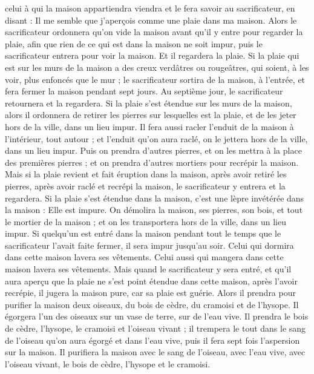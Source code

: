 \begin{multicols}{2}
celui à qui la maison appartiendra viendra et le fera savoir au sacrificateur, en disant : Il me semble que j'aperçois comme une plaie dans ma maison.
Alors le sacrificateur ordonnera qu'on vide la maison avant qu'il y entre pour regarder la plaie, afin que rien de ce qui est dans la maison ne soit impur, puis le sacrificateur entrera pour voir la maison.
Et il regardera la plaie. Si la plaie qui est sur les murs de la maison a des creux verdâtres ou rougeâtres, qui soient, à les voir, plus enfoncés que le mur ;
le sacrificateur sortira de la maison, à l'entrée, et fera fermer la maison pendant sept jours.
Au septième jour, le sacrificateur retournera et la regardera. Si la plaie s'est étendue sur les murs de la maison,
alors il ordonnera de retirer les pierres sur lesquelles est la plaie, et de les jeter hors de la ville, dans un lieu impur.
Il fera aussi racler l'enduit de la maison à l'intérieur, tout autour ; et l'enduit qu'on aura raclé, on le jettera hors de la ville, dans un lieu impur.
Puis on prendra d'autres pierres, et on les mettra à la place des premières pierres ; et on prendra d'autres mortiers pour recrépir la maison.
Mais si la plaie revient et fait éruption dans la maison, après avoir retiré les pierres, après avoir raclé et recrépi la maison,
le sacrificateur y entrera et la regardera. Si la plaie s'est étendue dans la maison, c'est une lèpre invétérée dans la maison : Elle est impure.
On démolira la maison, ses pierres, son bois, et tout le mortier de la maison ; et on les transportera hors de la ville, dans un lieu impur.
Si quelqu'un est entré dans la maison pendant tout le temps que le sacrificateur l'avait faite fermer, il sera impur jusqu'au soir.
Celui qui dormira dans cette maison lavera ses vêtements. Celui aussi qui mangera dans cette maison lavera ses vêtements.
Mais quand le sacrificateur y sera entré, et qu'il aura aperçu que la plaie ne s'est point étendue dans cette maison, après l'avoir recrépie, il jugera la maison pure, car sa plaie est guérie.
Alors il prendra pour purifier la maison deux oiseaux, du bois de cèdre, du cramoisi et de l'hysope.
Il égorgera l'un des oiseaux sur un vase de terre, sur de l'eau vive.
Il prendra le bois de cèdre, l'hysope, le cramoisi et l'oiseau vivant ; il trempera le tout dans le sang de l'oiseau qu'on aura égorgé et dans l'eau vive, puis il fera sept fois l'aspersion sur la maison.
Il purifiera la maison avec le sang de l'oiseau, avec l'eau vive, avec l'oiseau vivant, le bois de cèdre, l'hysope et le cramoisi.

\end{multicols}
